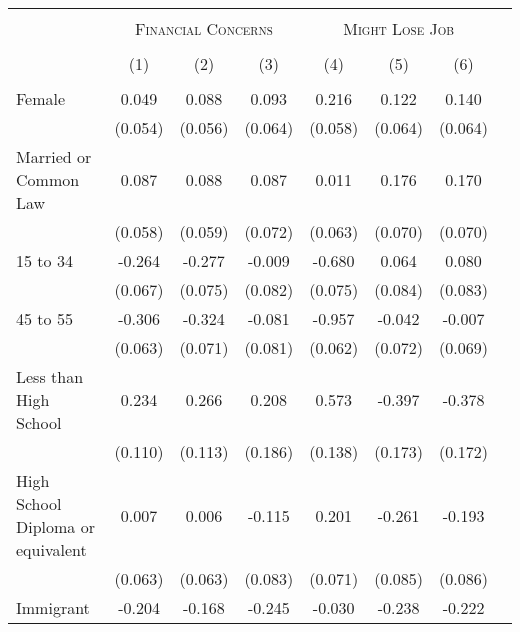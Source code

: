 \begin{tabular*}{\textwidth}{ @{\extracolsep{\fill}}l*{7}{c}}
\hline\hline
\\
& \multicolumn{3}{c}{ \textsc{Financial Concerns} } & \multicolumn{3}{c}{ \textsc{Might Lose Job} } \\
 \cline{2-4} \cline{5-7} \\
                                                  &\multicolumn{1}{c}{(1)}&\multicolumn{1}{c}{(2)}&\multicolumn{1}{c}{(3)}&\multicolumn{1}{c}{(4)}&\multicolumn{1}{c}{(5)}&\multicolumn{1}{c}{(6)}\\
\hline
\\
Female                                            &    0.049&    0.088&    0.093&    0.216&    0.122&    0.140\\
                                                  &  (0.054)&  (0.056)&  (0.064)&  (0.058)&  (0.064)&  (0.064)\\[0.5em]
Married or Common Law                             &    0.087&    0.088&    0.087&    0.011&    0.176&    0.170\\
                                                  &  (0.058)&  (0.059)&  (0.072)&  (0.063)&  (0.070)&  (0.070)\\[0.5em]
15 to 34                                          &   -0.264&   -0.277&   -0.009&   -0.680&    0.064&    0.080\\
                                                  &  (0.067)&  (0.075)&  (0.082)&  (0.075)&  (0.084)&  (0.083)\\[0.5em]
45 to 55                                          &   -0.306&   -0.324&   -0.081&   -0.957&   -0.042&   -0.007\\
                                                  &  (0.063)&  (0.071)&  (0.081)&  (0.062)&  (0.072)&  (0.069)\\[0.5em]
Less than High School                             &    0.234&    0.266&    0.208&    0.573&   -0.397&   -0.378\\
                                                  &  (0.110)&  (0.113)&  (0.186)&  (0.138)&  (0.173)&  (0.172)\\[0.5em]
High School Diploma or equivalent                 &    0.007&    0.006&   -0.115&    0.201&   -0.261&   -0.193\\
                                                  &  (0.063)&  (0.063)&  (0.083)&  (0.071)&  (0.085)&  (0.086)\\[0.5em]
Immigrant                                         &   -0.204&   -0.168&   -0.245&   -0.030&   -0.238&   -0.222\\

\end{tabular*}
